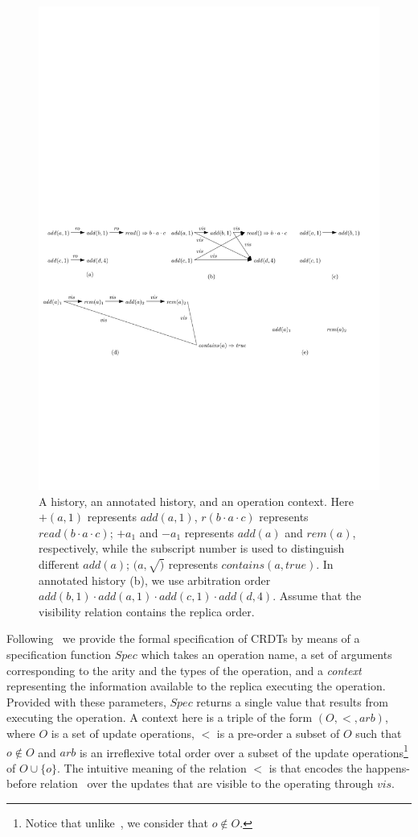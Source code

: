 \begin{figure}[t]
  \centering
  \includegraphics[width=0.75 \textwidth]{figures/PIC-his-anhis-context.pdf}
  \caption{A history, an annotated history, and an operation context. Here $+(a,1)$ represents $\mathit{add}(a,1)$, $r(b \cdot a \cdot c)$ represents $\mathit{read}(b \cdot a \cdot c)$; $+a_1$ and $-a_1$ represents $\mathit{add}(a)$ and $\mathit{rem}(a)$, respectively, while the subscript number is used to distinguish different $\mathit{add(a)}$; $(a,\surd)$ represents $\mathit{contains}(a,\mathit{true})$. In annotated history (b), we use arbitration order $\mathit{add}(b,1) \cdot \mathit{add}(a,1) \cdot \mathit{add}(c,1) \cdot \mathit{add}(d,4)$. Assume that the visibility relation contains the replica order.}
  \label{fig:history, annotated history and operation context}
\end{figure}


Following~\cite{Burkhardt:2014} we provide the formal specification of
CRDTs by means of a specification function $\mathit{Spec}$ which takes
an operation name, a set of arguments corresponding to the arity and
the types of the operation, and a \emph{context} representing the
information available to the replica executing the operation.
Provided with these parameters, $\mathit{Spec}$ returns a single value
that results from executing the operation.
%
A context here is a triple of the form $(O,<,\mathit{arb})$, where $O$
is a set of update operations, $<$ is a pre-order a subset of $O$ such
that $o \notin O$ and $\mathit{arb}$ is an irreflexive total order
over a subset of the update operations\footnote{Notice that
  unlike~\cite{Burkhardt:2014}, we consider that $o \notin O$.}
of $O \cup \{o\}$.
%
%
The intuitive meaning of the relation $<$ is that encodes the
happens-before relation~\cite{Lamport} over the updates that are
visible to the operating through $\mathit{vis}$.

